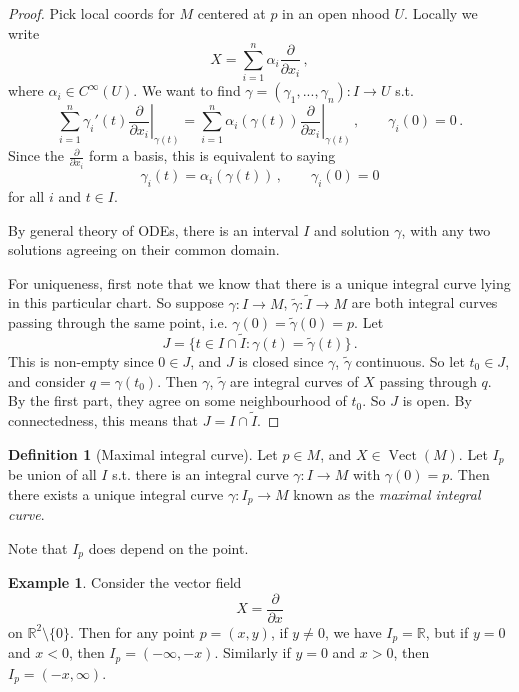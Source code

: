 \documentclass[a4paper,11pt]{article}
\theoremstyle{definition}
\newtheorem*{defn}{Definition}
\newtheorem*{ex}{Example}
\DeclareMathOperator{\Vect}{Vect}
\numberwithin{equation}{section}
\begin{document}
\begin{proof}
Pick local coords for $M$ centered at $p$ in an open nhood $U$. Locally we write
\[
X=\sum_{i=1}^n\alpha_i\frac{\partial}{\partial x_i}\,,
\]
where $\alpha_i\in C^\infty(U)$. We want to find $\gamma=(\gamma_1,...,\gamma_n):I\rightarrow U$ s.t.
\[
\sum_{i=1}^n\gamma_i'(t)\left.\frac{\partial}{\partial x_i}\right|_{\gamma(t)}=\sum_{i=1}^n\alpha_i(\gamma(t))\left.\frac{\partial}{\partial x_i}\right|_{\gamma(t)}\,,\qquad\gamma_i(0)=0\,.
\]
Since the $\frac{\partial}{\partial x_i}$ form a basis, this is equivalent to saying
\[
\gamma_i(t)=\alpha_i(\gamma(t))\,,\qquad\gamma_i(0)=0
\]
for all $i$ and $t\in I$.

By general theory of ODEs, there is an interval $I$ and solution $\gamma$, with any two solutions agreeing on their common domain.

For uniqueness, first note that we know that there is a unique integral curve lying in this particular chart. So suppose $\gamma:I\rightarrow M$, $\tilde{\gamma}:\tilde{I}\rightarrow M$ are both integral curves passing through the same point, i.e. $\gamma(0)=\tilde{\gamma}(0)=p$. Let
\[
J=\{t\in I\cap \tilde{I}:\gamma(t)=\tilde{\gamma}(t)\}\,.
\]
This is non-empty since $0\in J$, and $J$ is closed since $\gamma$, $\tilde{\gamma}$ continuous. So let $t_0\in J$, and consider $q=\gamma(t_0)$. Then $\gamma$, $\tilde{\gamma}$ are integral curves of $X$ passing through $q$. By the first part, they agree on some neighbourhood of $t_0$. So $J$ is open. By connectedness, this means that $J=I\cap\tilde{I}$.
\end{proof}

\begin{defn}[Maximal integral curve]
Let $p\in M$, and $X\in\Vect(M)$. Let $I_p$ be union of all $I$ s.t. there is an integral curve $\gamma:I\rightarrow M$ with $\gamma(0)=p$. Then there exists a unique integral curve $\gamma:I_p\rightarrow M$ known as the \emph{maximal integral curve}.
\end{defn}

Note that $I_p$ does depend on the point.

\begin{ex}
Consider the vector field
\[
X=\frac{\partial}{\partial x}
\]
on $\mathbb{R}^2\setminus\{0\}$. Then for any point $p=(x,y)$, if $y\neq0$, we have $I_p=\mathbb{R}$, but if $y=0$ and $x<0$, then $I_p=(-\infty,-x)$. Similarly if $y=0$ and $x>0$, then $I_p=(-x,\infty)$.

\begin{figure}[h]
    \centering
\end{figure}
\end{ex}
\end{document}
